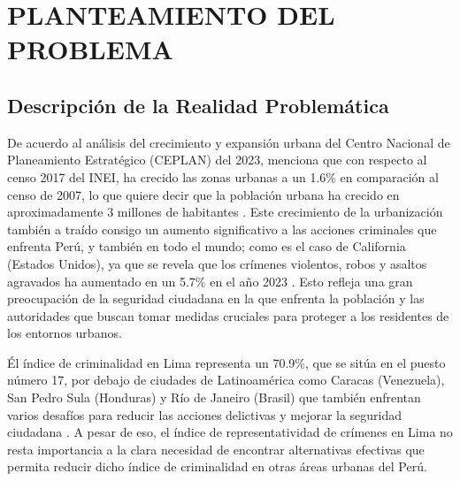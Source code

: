 \chapter{PLANTEAMIENTO DEL PROBLEMA}
\section{Descripción de la Realidad Problemática}

De acuerdo al análisis del crecimiento y expansión urbana del Centro Nacional de Planeamiento Estratégico (CEPLAN) del 2023, menciona que con respecto al censo 2017 del INEI, ha crecido las zonas urbanas a un 1.6\% en comparación al censo de 2007, lo que quiere decir que la población urbana ha crecido en aproximadamente 3 millones de habitantes \parencite{cu_ceplan}. Este crecimiento de la urbanización también a traído consigo un aumento significativo a las acciones criminales que enfrenta Perú, y también en todo el mundo; como es el caso de California (Estados Unidos), ya que se revela que los crímenes violentos, robos y asaltos agravados ha aumentado en un 5.7\% en el año 2023 \parencite{tec_PPIC}. Esto refleja una gran preocupación de la seguridad ciudadana en la que enfrenta la población y las autoridades que buscan tomar medidas cruciales para proteger a los residentes de los entornos urbanos. 

Él índice de criminalidad en Lima representa un 70.9\%, que se sitúa en el puesto número 17, por debajo de ciudades de Latinoamérica como Caracas (Venezuela), San Pedro Sula (Honduras) y Río de Janeiro (Brasil) que también enfrentan varios desafíos para reducir las acciones delictivas y mejorar la seguridad ciudadana \parencite{cu_numbeo2023}. A pesar de eso, el índice de representatividad de crímenes en Lima no resta importancia a la clara necesidad de encontrar alternativas efectivas que permita reducir dicho índice de criminalidad en otras áreas urbanas del Perú.%

